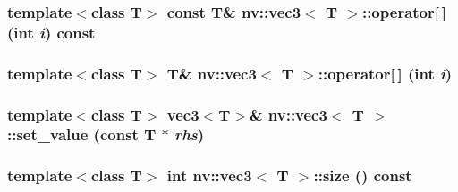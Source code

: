 \hypertarget{classnv_1_1vec3_f7012d86438ec98f4e648a97a586b301}{
\subsubsection[{operator[]}]{\setlength{\rightskip}{0pt plus 5cm}template$<$class T$>$ const T\& {\bf nv::vec3}$<$ T $>$::operator\mbox{[}$\,$\mbox{]} (int {\em i}) const}}
\label{classnv_1_1vec3_f7012d86438ec98f4e648a97a586b301}


\hypertarget{classnv_1_1vec3_72dfa9cf18fef05de845fb4283b2fa04}{
\subsubsection[{operator[]}]{\setlength{\rightskip}{0pt plus 5cm}template$<$class T$>$ T\& {\bf nv::vec3}$<$ T $>$::operator\mbox{[}$\,$\mbox{]} (int {\em i})}}
\label{classnv_1_1vec3_72dfa9cf18fef05de845fb4283b2fa04}


\hypertarget{classnv_1_1vec3_5f83b5b9c0cf8ee096e8a962cb6ed7f7}{
\subsubsection[{set\_\-value}]{\setlength{\rightskip}{0pt plus 5cm}template$<$class T$>$ {\bf vec3}$<$T$>$\& {\bf nv::vec3}$<$ T $>$::set\_\-value (const T $\ast$ {\em rhs})}}
\label{classnv_1_1vec3_5f83b5b9c0cf8ee096e8a962cb6ed7f7}


\hypertarget{classnv_1_1vec3_1f16bfe4486fa47b5c148993d6905433}{
\subsubsection[{size}]{\setlength{\rightskip}{0pt plus 5cm}template$<$class T$>$ int {\bf nv::vec3}$<$ T $>$::size () const}}
\label{classnv_1_1vec3_1f16bfe4486fa47b5c148993d6905433}





